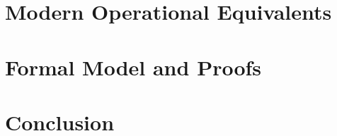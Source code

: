 \documentclass[12pt,a4paper]{book}
\theoremstyle{definition}
\theoremstyle{remark}
\begin{document}
\chapter{Modern Operational Equivalents}





\chapter{Formal Model and Proofs}





\chapter{Conclusion}



\backmatter
\end{document}
